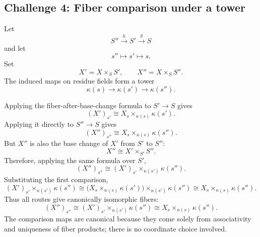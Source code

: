 \subsection*{Challenge 4: Fiber comparison under a tower}
\begin{solution}
Let
\[
S''\xrightarrow{h}S'\xrightarrow{g}S
\]
and let
\[
s''\mapsto s'\mapsto s.
\]
Set
\[
X'=X\times_SS',
\qquad
X''=X\times_SS''.
\]
The induced maps on residue fields form a tower
\[
\kappa(s)\longrightarrow\kappa(s')\longrightarrow\kappa(s'').
\]

Applying the fiber-after-base-change formula to \(S'\to S\) gives
\[
(X')_{s'}
\cong
X_s\times_{\kappa(s)}\kappa(s').
\]
Applying it directly to \(S''\to S\) gives
\[
(X'')_{s''}
\cong
X_s\times_{\kappa(s)}\kappa(s'').
\]
But \(X''\) is also the base change of \(X'\) from \(S'\) to \(S''\):
\[
X''\cong X'\times_{S'}S''.
\]
Therefore, applying the same formula over \(S'\),
\[
(X'')_{s''}
\cong
(X')_{s'}\times_{\kappa(s')}\kappa(s'').
\]
Substituting the first comparison,
\[
(X')_{s'}\times_{\kappa(s')}\kappa(s'')
\cong
\bigl(X_s\times_{\kappa(s)}\kappa(s')\bigr)
\times_{\kappa(s')}
\kappa(s'')
\cong
X_s\times_{\kappa(s)}\kappa(s'').
\]
Thus all routes give canonically isomorphic fibers:
\[
\boxed{
(X'')_{s''}
\cong
(X')_{s'}\times_{\kappa(s')}\kappa(s'')
\cong
X_s\times_{\kappa(s)}\kappa(s'')
}.
\]
The comparison maps are canonical because they come solely from associativity and uniqueness of fiber products; there is no coordinate choice involved.
\end{solution}

